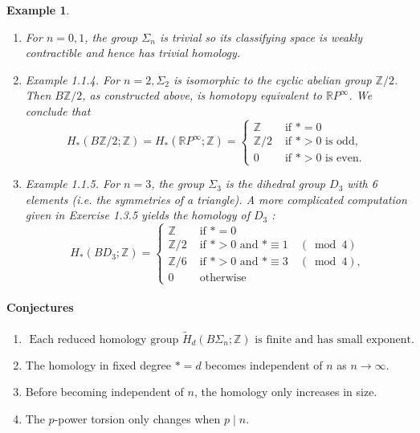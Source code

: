 \documentclass{book}
\newtheorem{example}{Example}
\begin{document}
\begin{example}
    \begin{enumerate}
        \item For $n=0,1$, the group $\Sigma_n$ is trivial so its classifying space is weakly contractible and hence has trivial homology.
        \item Example 1.1.4. For $n=2, \Sigma_2$ is isomorphic to the cyclic abelian group $\mathbb{Z} / 2$. Then $B \mathbb{Z} / 2$, as constructed above, is homotopy equivalent to $\mathbb{R} P^{\infty}$. We conclude that
        $$
        H_*(B \mathbb{Z} / 2 ; \mathbb{Z})=H_*\left(\mathbb{R} P^{\infty} ; \mathbb{Z}\right)= \begin{cases}\mathbb{Z} & \text { if } *=0 \\ \mathbb{Z} / 2 & \text { if } *>0 \text { is odd, } \\ 0 & \text { if } *>0 \text { is even. }\end{cases}
        $$
    \item
        Example 1.1.5. For $n=3$, the group $\Sigma_3$ is the dihedral group $D_3$ with 6 elements (i.e. the symmetries of a triangle). A more complicated computation given in Exercise 1.3.5 yields the homology of $D_3$ :
$$
H_*\left(B D_3 ; \mathbb{Z}\right)=\left\{\begin{array}{lll}
\mathbb{Z} & \text { if } *=0 \\
\mathbb{Z} / 2 & \text { if } *>0 \text { and } * \equiv 1 \quad(\bmod 4) \\
\mathbb{Z} / 6 & \text { if } *>0 \text { and } * \equiv 3 \quad(\bmod 4), \\
0 & \text { otherwise }
\end{array}\right.
$$
    \end{enumerate}
\end{example}

\paragraph*{Conjectures}

\begin{enumerate}
    \item $\text { Each reduced homology group } \widetilde{H}_d\left(B \Sigma_n ; \mathbb{Z}\right) \text { is finite and has small exponent. }$
    \item The homology in fixed degree $*=d$ becomes independent of $n$ as $n \rightarrow \infty$.
    \item Before becoming independent of $n$, the homology only increases in size.
    \item The $p$-power torsion only changes when $p \mid n$.
\end{enumerate}
\end{document}
